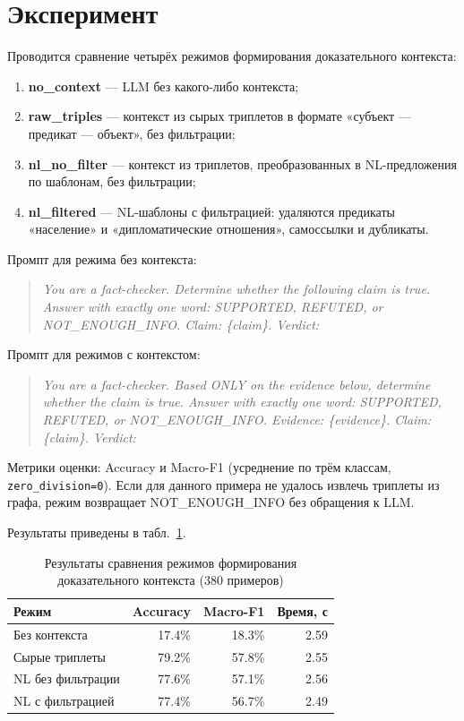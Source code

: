 \documentclass{misisarticle}
\begin{document}
\section{Эксперимент}

Проводится сравнение четырёх режимов формирования
доказательного контекста:
\begin{enumerate}
  \item \textbf{no\_context} — LLM без какого-либо контекста;
  \item \textbf{raw\_triples} — контекст из сырых триплетов
    в формате «субъект — предикат — объект», без фильтрации;
  \item \textbf{nl\_no\_filter} — контекст из триплетов,
    преобразованных в NL-предложения по шаблонам,
    без фильтрации;
  \item \textbf{nl\_filtered} — NL-шаблоны с фильтрацией:
    удаляются предикаты «население» и
    «дипломатические отношения», самоссылки и дубликаты.
\end{enumerate}

Промпт для режима без контекста:

\begin{quote}
\small
\textit{You are a fact-checker. Determine whether the
following claim is true. Answer with exactly one word:
SUPPORTED, REFUTED, or NOT\_ENOUGH\_INFO.
Claim: \{claim\}. Verdict:}
\end{quote}

Промпт для режимов с контекстом:

\begin{quote}
\small
\textit{You are a fact-checker. Based ONLY on the evidence
below, determine whether the claim is true. Answer with
exactly one word: SUPPORTED, REFUTED, or NOT\_ENOUGH\_INFO.
Evidence: \{evidence\}. Claim: \{claim\}. Verdict:}
\end{quote}

Метрики оценки: Accuracy и Macro-F1
(усреднение по трём классам, \texttt{zero\_division=0}).
Если для данного примера не удалось извлечь
триплеты из графа, режим возвращает NOT\_ENOUGH\_INFO
без обращения к LLM.

Результаты приведены в табл.~\ref{tab:res}.

\begin{table}[h]
\centering
\caption{Результаты сравнения режимов формирования
доказательного контекста (380 примеров)}\label{tab:res}
\begin{tabular}{lrrr}
\hline
\textbf{Режим} & \textbf{Accuracy} & \textbf{Macro-F1} & \textbf{Время, с} \\
\hline
Без контекста         & 17.4\% & 18.3\% & 2.59 \\
Сырые триплеты        & 79.2\% & 57.8\% & 2.55 \\
NL без фильтрации     & 77.6\% & 57.1\% & 2.56 \\
NL с фильтрацией      & 77.4\% & 56.7\% & 2.49 \\
\hline
\end{tabular}
\end{table}
\end{document}
